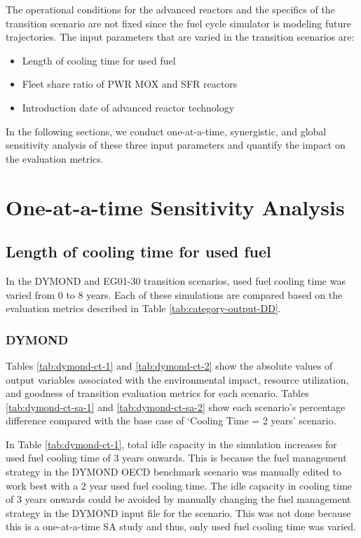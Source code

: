 The operational conditions for the advanced reactors and
the specifics of the transition scenario are not 
fixed since the fuel cycle simulator is modeling future 
trajectories. 
The input parameters that are varied in the
transition scenarios are: 
\begin{itemize}
    \item Length of cooling time for used fuel 
    \item Fleet share ratio of PWR MOX and SFR reactors 
	\item Introduction date of advanced reactor technology
\end{itemize}

In the following sections, 
we conduct one-at-a-time, synergistic, and global
sensitivity analysis of these three input parameters and 
quantify the impact on the evaluation metrics.  

\section{One-at-a-time Sensitivity Analysis}
\label{sec:oat}

\subsection{Length of cooling time for used fuel}
In the DYMOND and \Cyclus EG01-30 transition scenarios, 
used fuel cooling time was varied from 0 to 8 years. 
Each of these simulations are compared based on the evaluation 
metrics described in Table \ref{tab:category-output-DD}.

\subsubsection{\textbf{DYMOND}}
Tables \ref{tab:dymond-ct-1} and \ref{tab:dymond-ct-2} show 
the absolute values of 
output variables associated with the environmental impact, 
resource utilization, and goodness of transition evaluation 
metrics for each scenario. 
Tables \ref{tab:dymond-ct-sa-1} and \ref{tab:dymond-ct-sa-2} 
show each scenario's percentage 
difference compared with the base case of `Cooling Time = 2 years'
scenario.

In Table \ref{tab:dymond-ct-1}, total idle capacity 
in the simulation increases for used fuel cooling time of 3 years 
onwards. 
This is because the fuel management strategy in the 
DYMOND OECD benchmark scenario was 
manually edited to work best with a 2 year used fuel cooling time.
The idle capacity in cooling time of 3 years onwards could be 
avoided by manually changing the fuel management strategy
in the DYMOND input file for the scenario. 
This was not done because this is a one-at-a-time \gls{SA} study 
and thus, only used fuel cooling time was varied. 

